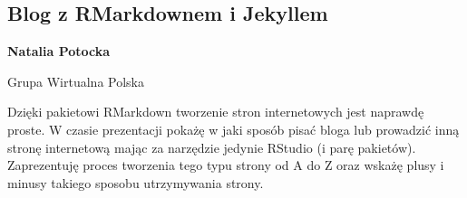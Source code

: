 \documentclass[\main/boa.tex]{subfiles}
\begin{document}
\subsection{Blog z RMarkdownem i Jekyllem }

\begin{minipage}{0.915\textwidth}
	\centering
  {\bf {} Natalia Potocka }
\end{minipage}

\vskip 0.3cm

\begin{affiliations}
\begin{minipage}{0.915\textwidth}
\centering
Grupa Wirtualna Polska \\[-2pt]
\end{minipage}
\end{affiliations}

\vskip 0.8cm

Dzięki pakietowi RMarkdown tworzenie stron internetowych jest naprawdę proste. W czasie prezentacji pokażę w jaki sposób pisać bloga lub prowadzić inną stronę internetową mając za narzędzie jedynie RStudio (i parę pakietów). Zaprezentuję proces tworzenia tego typu strony od A do Z oraz wskażę plusy i minusy takiego sposobu utrzymywania strony. 
\end{document}
